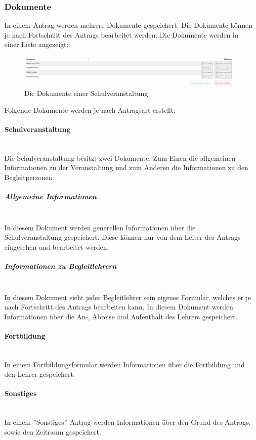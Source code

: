 \subsubsection{Dokumente}
In einem Antrag werden mehrere Dokumente gespeichert. Die Dokumente können je nach Fortschritt des Antrags bearbeitet werden.
Die Dokumente werden in einer Liste angezeigt:
\begin{figure}
	\centering
	\includegraphics[width=1\linewidth]{images/documents}
	\caption[Dokumente eines Antrags]{Die Dokumente einer Schulveranstaltung}
	\label{fig:documents}
\end{figure}

Folgende Dokumente werden je nach Antragsart erstellt:
\paragraph{Schulveranstaltung}~\\
Die Schulveranstaltung besitzt zwei Dokumente. Zum Einen die allgemeinen Informationen zu der Veranstaltung und zum Anderen die Informationen zu den Begleitpersonen.
\subparagraph{Allgemeine Informationen}~\\
In diesem Dokument werden generellen Informationen über die Schulveranstaltung gespeichert. Diese können nur von dem Leiter des Antrags eingesehen und bearbeitet werden.
\subparagraph{Informationen zu Begleitlehrern}~\\
In diesem Dokument sieht jeder Begleitlehrer sein eigenes Formular, welches er je nach Fortschritt des Antrags bearbeiten kann. In diesem Dokument werden Informationen über die An-, Abreise und Aufenthalt des Lehrers gespeichert.
\paragraph{Fortbildung}~\\
In einem Fortbildungsformular werden Informationen über die Fortbildung und den Lehrer gespeichert.
\paragraph{Sonstiges}~\\
In einem ''Sonstiges'' Antrag werden Informationen über den Grund des Antrags, sowie den Zeitraum gespeichert.
